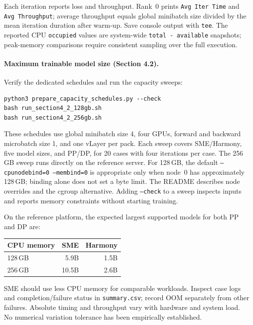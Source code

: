 Each iteration reports loss and throughput. Rank~0 prints
\texttt{Avg Iter Time} and \texttt{Avg Throughput}; average
throughput equals global minibatch size divided by the mean
iteration duration after warm-up. Save console output with
\texttt{tee}. The reported CPU \texttt{occupied} values are
system-wide \texttt{total - available} snapshots; peak-memory
comparisons require consistent sampling over the full execution.

\paragraph{Maximum trainable model size (Section 4.2).}
Verify the dedicated schedules and run the capacity sweeps:
\begin{verbatim}
python3 prepare_capacity_schedules.py --check
bash run_section4_2_128gb.sh
bash run_section4_2_256gb.sh
\end{verbatim}
These schedules use global minibatch size 4, four GPUs, forward
and backward microbatch size 1, and one vLayer per pack. Each sweep
covers SME/Harmony, five model sizes, and PP/DP, for 20 cases with
four iterations per case. The 256\,GB sweep runs directly on the
reference server. For 128\,GB, the default
\texttt{--cpunodebind=0 --membind=0} is appropriate only when node~0
has approximately 128\,GB; binding alone does not set a byte limit.
The README describes node overrides and the cgroup alternative.
Adding \texttt{--check} to a sweep inspects inputs and reports memory
constraints without starting training.

On the reference platform, the expected largest supported models
for both PP and DP are:
\begin{center}
\begin{tabular}{lrr}
\hline
CPU memory & SME & Harmony \\
\hline
128\,GB & 5.9B & 1.5B \\
256\,GB & 10.5B & 2.6B \\
\hline
\end{tabular}
\end{center}
SME should use less CPU memory for comparable workloads. Inspect
case logs and completion/failure status in \texttt{summary.csv};
record OOM separately from other failures. Absolute timing and
throughput vary with hardware and system load. No numerical
variation tolerance has been empirically established.
